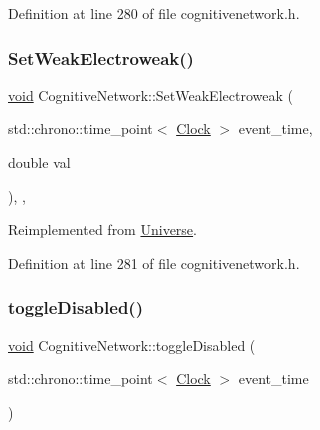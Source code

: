Definition at line 280 of file cognitivenetwork.\+h.

\mbox{\label{class_cognitive_network_a116f6818986a622e4a318857859e2495}} 
\subsubsection{\texorpdfstring{Set\+Weak\+Electroweak()}{SetWeakElectroweak()}}
{\footnotesize\ttfamily \mbox{\hyperlink{glad_8h_a950fc91edb4504f62f1c577bf4727c29}{void}} Cognitive\+Network\+::\+Set\+Weak\+Electroweak (\begin{DoxyParamCaption}\item[{std\+::chrono\+::time\+\_\+point$<$ \mbox{\hyperlink{universe_8h_a0ef8d951d1ca5ab3cfaf7ab4c7a6fd80}{Clock}} $>$}]{event\+\_\+time,  }\item[{double}]{val }\end{DoxyParamCaption})\hspace{0.3cm}{\ttfamily [inline]}, {\ttfamily [final]}, {\ttfamily [virtual]}}



Reimplemented from \mbox{\hyperlink{class_universe_a2d3d642bfdc863248e93535832fa4b00}{Universe}}.



Definition at line 281 of file cognitivenetwork.\+h.

\mbox{\label{class_cognitive_network_abeac08d7cbf9df4b36de40aa9301e978}} 
\subsubsection{\texorpdfstring{toggle\+Disabled()}{toggleDisabled()}}
{\footnotesize\ttfamily \mbox{\hyperlink{glad_8h_a950fc91edb4504f62f1c577bf4727c29}{void}} Cognitive\+Network\+::toggle\+Disabled (\begin{DoxyParamCaption}\item[{std\+::chrono\+::time\+\_\+point$<$ \mbox{\hyperlink{universe_8h_a0ef8d951d1ca5ab3cfaf7ab4c7a6fd80}{Clock}} $>$}]{event\+\_\+time }\end{DoxyParamCaption})\hspace{0.3cm}{\ttfamily [inline]}}



